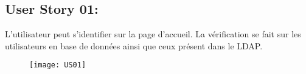 \newpage
\subsection{User Story 01:}
L'utilisateur peut s'identifier sur la page d'accueil. La vérification se fait sur les utilisateurs en base de données
ainsi que ceux présent dans le LDAP.


\begin{figure}[!h]
  \begin{center}
        \texttt{[image: US01]}
        \label{US01-dia}
  \end{center}
\end{figure}

